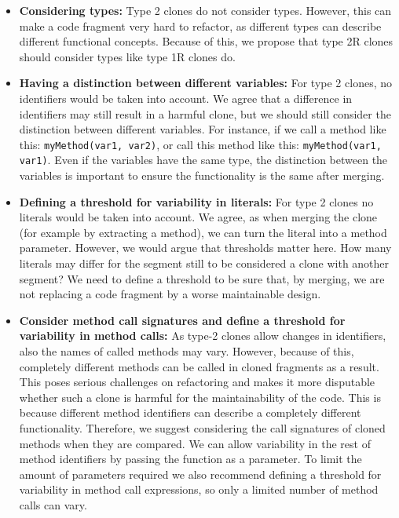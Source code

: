 \documentclass[a4paper]{article}
\begin{document}
\begin{itemize}
  \item \textbf{Considering types:} Type 2 clones do not consider types. However, this can make a code fragment very hard to refactor, as different types can describe different functional concepts. Because of this, we propose that type 2R clones should consider types like type 1R clones do.
  \item \textbf{Having a distinction between different variables:} For type 2 clones, no identifiers would be taken into account. We agree that a difference in identifiers may still result in a harmful clone, but we should still consider the distinction between different variables. For instance, if we call a method like this: \texttt{myMethod(var1, var2)}, or call this method like this: \texttt{myMethod(var1, var1)}. Even if the variables have the same type, the distinction between the variables is important to ensure the functionality is the same after merging.
  \item \textbf{Defining a threshold for variability in literals:} For type 2 clones no literals would be taken into account. We agree, as when merging the clone (for example by extracting a method), we can turn the literal into a method parameter. However, we would argue that thresholds matter here. How many literals may differ for the segment still to be considered a clone with another segment? We need to define a threshold to be sure that, by merging, we are not replacing a code fragment by a worse maintainable design.
  \item \textbf{Consider method call signatures and define a threshold for variability in method calls:} As type-2 clones allow changes in identifiers, also the names of called methods may vary. However, because of this, completely different methods can be called in cloned fragments as a result. This poses serious challenges on refactoring and makes it more disputable whether such a clone is harmful for the maintainability of the code. This is because different method identifiers can describe a completely different functionality. Therefore, we suggest considering the call signatures of cloned methods when they are compared. We can allow variability in the rest of method identifiers by passing the function as a parameter. To limit the amount of parameters required we also recommend defining a threshold for variability in method call expressions, so only a limited number of method calls can vary.
\end{itemize}
\end{document}
